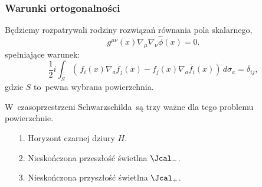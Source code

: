 \documentclass[10pt,t]{beamer}
\begin{document}
\begin{frame}
  \frametitle{Warunki ortogonalności}


  Będziemy rozpatrywali rodziny rozwiązań równania pola skalarnego,
  \begin{equation}
    \label{eq:Promieniowanie-Hawkinga-37}
    g^{ \mu \nu }( x ) \nabla_{ \mu } \nabla_{ \nu } \widehat{ \phi }( x ) = 0.
  \end{equation}
  spełniające warunek:
  \begin{equation}
    \label{eq:Promieniowanie-Hawkinga-38}
    \frac{ 1 }{ 2 } i\int_{ S } ( \, f_{ i }( x )
    \nabla_{ a }\bar{ f }_{ j }( x ) - f_{ j }( x )
    \nabla_{ a } \bar{ f }_{ i }( x ) )\, d\sigma_{ a }
    = \delta_{ i j },
  \end{equation}
  gdzie $S$ to~pewna wybrana powierzchnia.

  W~czasoprzestrzeni Schwarzschilda~są trzy ważne dla tego problemu
  powierzchnie.
  \begin{itemize}

  \item[1.] Horyzont czarnej dziury $H$.

  \item[2.] Nieskończona przeszłość świetlna $\Jcal_{ - }$.

  \item[3.] Nieskończona przyszłość świetlna $\Jcal_{ + }$.

  \end{itemize}

\end{frame}
\end{document}
